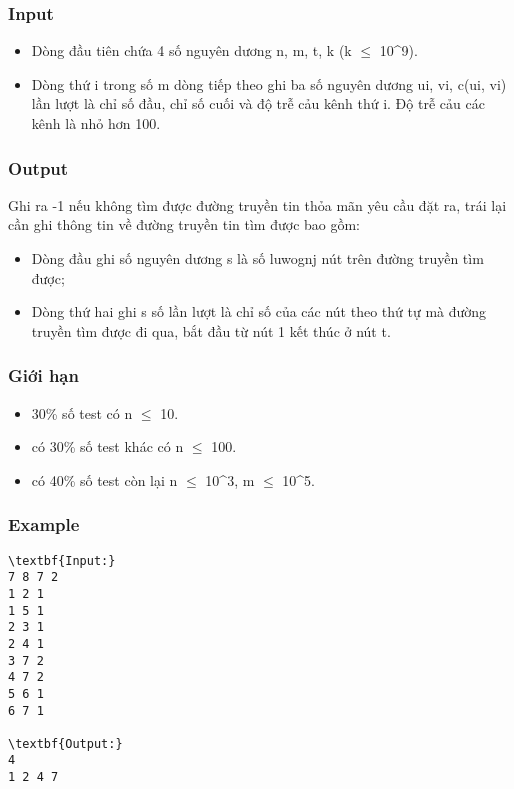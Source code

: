 \subsubsection{Input}
\begin{itemize}
	\item Dòng đầu tiên chứa 4 số nguyên dương n, m, t, k (k  $\le$  10^9).
	\item Dòng thứ i trong số m dòng tiếp theo ghi ba số nguyên dương ui, vi, c(ui, vi) lần lượt là chỉ số đầu, chỉ số cuối và độ trễ cảu kênh thứ i. Độ trễ cảu các kênh là nhỏ hơn 100.
\end{itemize}

\subsubsection{Output}

Ghi ra -1 nếu không tìm được đường truyền tin thỏa mãn yêu cầu đặt ra, trái lại cần ghi thông tin về đường truyền tin tìm được bao gồm:
\begin{itemize}
	\item Dòng đầu ghi số nguyên dương s là số luwognj nút trên đường truyền tìm được;
	\item Dòng thứ hai ghi s số lần lượt là chỉ số của các nút theo thứ tự mà đường truyền tìm được đi qua, bắt đầu từ nút 1 kết thúc ở nút t.
\end{itemize}

\subsubsection{Giới hạn}
\begin{itemize}
	\item 30\% số test có n  $\le$  10.
	\item có 30\% số test khác có n  $\le$  100.
	\item có 40\% số test còn lại n  $\le$  10^3, m  $\le$  10^5.
\end{itemize}

\subsubsection{Example}
\begin{verbatim}
\textbf{Input:}
7 8 7 2
1 2 1
1 5 1
2 3 1
2 4 1
3 7 2
4 7 2
5 6 1
6 7 1

\textbf{Output:}
4
1 2 4 7
\end{verbatim}
